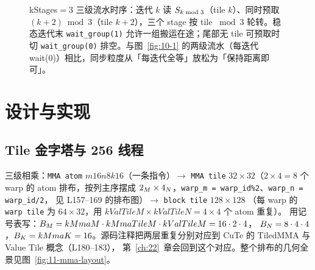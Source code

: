 \begin{figure}[H]
\caption{kStages$=3$ 三级流水时序：迭代 $k$ 读 $S\sb{k\bmod3}$（tile $k$）、同时预取 $(k{+}2)\bmod3$（tile $k{+}2$），三个 stage 按 tile $\bmod 3$ 轮转。稳态迭代末 \texttt{wait\_group(1)} 允许一组搬运在途；尾部无 tile 可预取时切 \texttt{wait\_group(0)} 排空。与图~\ref{fig:10-1} 的两级流水（每迭代 wait(0)）相比，同步粒度从「每迭代全等」放松为「保持距离即可」。}
\label{fig:11-kstages3}
\end{figure}

\section{设计与实现}

\subsection{Tile 金字塔与 256 线程}



三级相乘：\texttt{MMA atom} $m16n8k16$（一条指令）$\to$
\texttt{MMA tile} $32\times32$（$2\times4 = 8$ 个 warp 的 atom 排布，按列主序摆成
$2\sb {M}\times4\sb {N}$，\texttt{warp\_m = warp\_id\%2}、\texttt{warp\_n = warp\_id/2}，
见 L157--169 的排布图）$\to$ \texttt{block tile} $128\times128$
（每 warp 的 \texttt{warp tile} 为 $64\times32$，用
$kValTileM\times kValTileN = 4\times4$ 个 atom 重复）。
用记号表写：$B\sb M = kMmaM \cdot kMmaTileM \cdot kValTileM = 16\cdot2\cdot4$，
$B\sb N = 8\cdot4\cdot4$，$B\sb K = kMmaK = 16$。源码注释把两层重复分别对应到
CuTe 的 TiledMMA 与 Value Tile 概念（L180--183），
第~\ref{ch:22}~章会回到这个对应。整个排布的几何全景见图~\ref{fig:11-mma-layout}。

